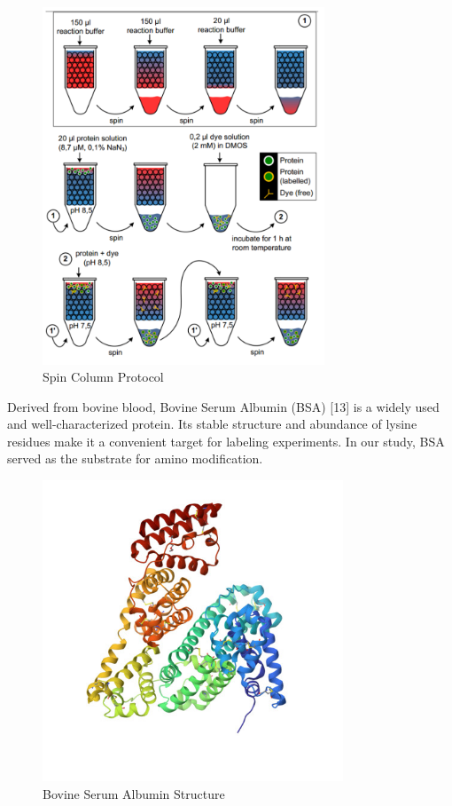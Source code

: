\documentclass[a4paper,english,12pt,bibliography=totoc]{scrreprt}
\begin{document}
\begin{figure}[H]
    \centering
    \includegraphics[width=0.75\textwidth]{spincolumnscheme.png}
    \caption{Spin Column Protocol}
    \label{fig:ViolinPlot}
\end{figure}


Derived from bovine blood, Bovine Serum Albumin (BSA) [13] is a widely used and well-characterized protein. Its stable structure and abundance of lysine residues make it a convenient target for labeling experiments. In our study, BSA served as the substrate for amino modification.

\begin{figure}[H]
    \centering
    \includegraphics[width=0.8\textwidth]{Bovine Serum Albumin.jpeg}
    \caption{Bovine Serum Albumin Structure}
    \label{fig:ViolinPlot}
\end{figure}
\end{document}
